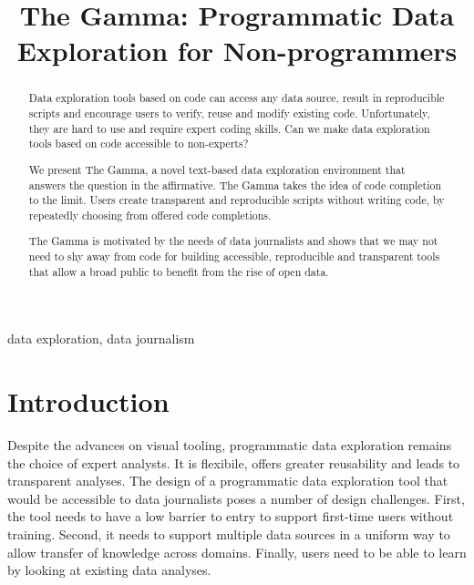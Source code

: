 \documentclass[conference]{IEEEtran}
\begin{document}
\title{\textbf{The Gamma}: Programmatic Data\\ Exploration for Non-programmers}
\author{
}

\maketitle

\begin{abstract}
Data exploration tools based on code can access any data source, result in reproducible scripts and
encourage users to verify, reuse and modify existing code. Unfortunately, they are hard to use and
require expert coding skills. Can we make data exploration tools based on code accessible to non-experts?

We present The Gamma, a novel text-based data exploration environment that answers the question in
the affirmative. The Gamma takes the idea of code completion to the limit. Users create transparent
and reproducible scripts without writing code, by repeatedly choosing from offered code completions.

The Gamma is motivated by the needs of data journalists and shows that we may not need to shy away
from code for building accessible, reproducible and transparent tools that allow a broad public to
benefit from the rise of open data.
\end{abstract}

\begin{IEEEkeywords}
data exploration, data journalism
\end{IEEEkeywords}
\IEEEpubidadjcol


\section{Introduction}
\noindent
Despite the advances on visual tooling, programmatic data exploration remains the choice of
expert analysts. It is flexibile, offers greater reusability and leads to transparent
analyses. The design of a programmatic data exploration tool that would be accessible to data
journalists poses a number of design challenges. First, the tool needs to have a low barrier to
entry to support first-time users without training. Second, it needs to support multiple
data sources in a uniform way to allow transfer of knowledge across domains. Finally, users need
to be able to learn by looking at existing data analyses.
\end{document}
